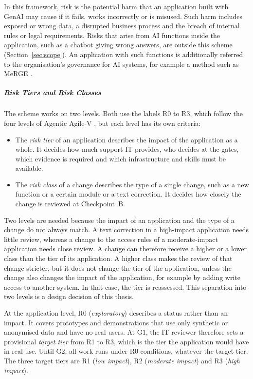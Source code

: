 \documentclass[10pt,a4paper]{article}
\begin{document}
In this framework, risk is the potential harm that an application built
with GenAI may cause if it fails, works incorrectly or is misused. Such
harm includes exposed or wrong data, a disrupted business process and the
breach of internal rules or legal requirements. Risks that arise from AI
functions inside the application, such as a chatbot giving wrong answers,
are outside this scheme (Section~\ref{sec:scope}). An application with
such functions is additionally referred to the organisation's governance
for AI systems, for example a method such as MeRGE \parencite{fetzer2026}.

\subparagraph{Risk Tiers and Risk Classes}

The scheme works on two levels. Both use the labels R0 to R3, which
follow the four levels of Agentic Agile-V \parencite{koch2026agentic},
but each level has its own criteria:

\begin{itemize}
    \item The \emph{risk tier} of an application describes the impact of
    the application as a whole. It decides how much support IT provides,
    who decides at the gates, which evidence is required and which
    infrastructure and skills must be available.
    \item The \emph{risk class} of a change describes the type of a single
    change, such as a new function or a certain module or a text correction. It decides how
    closely the change is reviewed at Checkpoint~B.
\end{itemize}

Two levels are needed because the impact of an application and the type
of a change do not always match. A text correction in a high-impact
application needs little review, whereas a change to the access rules of
a moderate-impact application needs close review. A change can therefore
receive a higher or a lower class than the tier of its application. A
higher class makes the review of that change stricter, but it does not
change the tier of the application, unless the change also changes the
impact of the application, for example by adding write access to another
system. In that case, the tier is reassessed. This separation into two
levels is a design decision of this thesis.

At the application level, R0 (\emph{exploratory}) describes a status
rather than an impact. It covers prototypes and demonstrations that use
only synthetic or anonymised data and have no real users. At G1, the IT
reviewer therefore sets a provisional \emph{target tier} from R1 to R3,
which is the tier the application would have in real use. Until G2, all
work runs under R0 conditions, whatever the target tier. The three
target tiers are R1 (\emph{low impact}), R2 (\emph{moderate impact}) and
R3 (\emph{high impact}).
\end{document}

